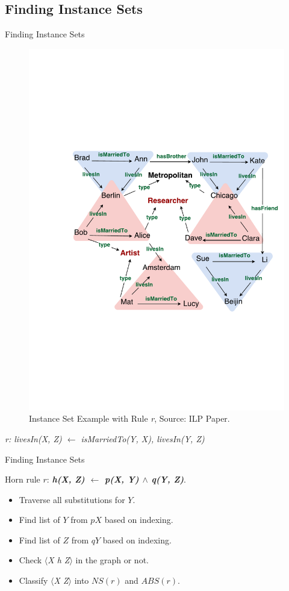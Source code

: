 \documentclass{beamer}
\begin{document}
\subsection{Finding Instance Sets}

\begin{frame}{Finding Instance Sets}

\begin{figure}[h]
	\centering
	\includegraphics[page=1,width=.5\textwidth]{example.pdf}
	\caption{Instance Set Example with Rule \textit{r}, Source: ILP Paper.}
\end{figure}

\centerline{\textit{r: livesIn(X, Z) $\leftarrow$ isMarriedTo(Y, X), livesIn(Y, Z)}}

\end{frame}

\begin{frame}{Finding Instance Sets}

Horn rule $r$: \textit{\textbf{h(X, Z) $\leftarrow$ p(X, Y) $\wedge$ q(Y, Z)}}.
\begin{itemize}
	\item Traverse all substitutions for $Y$.
	\item Find list of $Y$ from $pX$ based on indexing.
	\item Find list of $Z$ from $qY$ based on indexing.
	\item Check \textit{$\langle$X h Z$\rangle$} in the graph or not.
	\item Classify \textit{$\langle$X Z$\rangle$} into $NS(r)$ and $ABS(r)$.
\end{itemize}

\end{frame}
\end{document}
